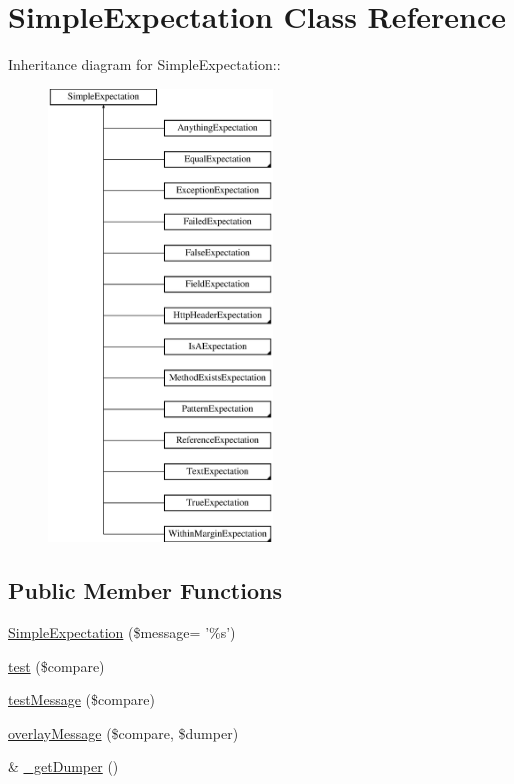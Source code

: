 \hypertarget{class_simple_expectation}{
\section{SimpleExpectation Class Reference}
\label{class_simple_expectation}
}
Inheritance diagram for SimpleExpectation::\begin{figure}[H]
\begin{center}
\leavevmode
\includegraphics[height=12cm]{class_simple_expectation}
\end{center}
\end{figure}
\subsection*{Public Member Functions}
\begin{DoxyCompactItemize}
\item 
\hyperlink{class_simple_expectation_a77931c93ad58a8c51cda5a659628d705}{SimpleExpectation} (\$message= '\%s')
\item 
\hyperlink{class_simple_expectation_aa2b98f827e7487ebe12cedb9ad39d061}{test} (\$compare)
\item 
\hyperlink{class_simple_expectation_a15b69edf659c76f6543aa98d8d85b025}{testMessage} (\$compare)
\item 
\hyperlink{class_simple_expectation_afa9eddaa1f6818c6a3a6a89e3a36468a}{overlayMessage} (\$compare, \$dumper)
\item 
\& \hyperlink{class_simple_expectation_aed678acaf449c68f660730cefe4173c3}{\_\-getDumper} ()
\end{DoxyCompactItemize}
